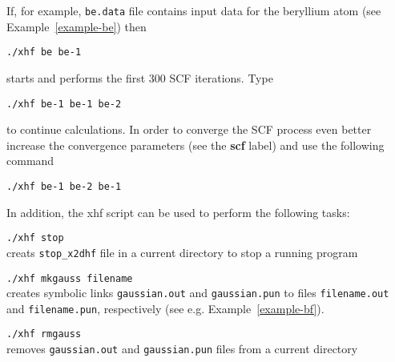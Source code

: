 \documentclass[12pt,a4paper]{article}
\begin{document}
If, for example, \texttt{be.data} file contains input data for
the beryllium atom (see Example~\ref{example-be}) then 
\begin{description} 
\item \hspace*{0.5cm} \texttt{./xhf be be-1}
\end{description} 
starts and performs the first 300 SCF iterations. Type
\begin{description} 
\item \hspace*{0.5cm} \texttt{./xhf be-1 be-1 be-2}
\end{description}  
to continue calculations. In order to converge the SCF process
even better increase the convergence parameters (see the \textbf{scf}
label) and use the following
command
\begin{description} 
\item \hspace*{0.5cm} \texttt{./xhf be-1 be-2 be-1}
\end{description}  



In addition, the xhf script can be used to perform the following
tasks:

\begin{description} 
\item \hspace*{0.5cm} \texttt{./xhf stop}\\ creats
  \texttt{stop\_x2dhf} file in a current directory to stop a running
  program%
\end{description} 

\begin{description} 
\item \hspace*{0.5cm} \texttt{./xhf mkgauss filename}\\ creates
  symbolic links \texttt{gaussian.out} and \texttt{gaussian.pun} to
  files \texttt{filename.\-out} and \texttt{filename.pun},
  respectively (see e.g. Example~\ref{example-bf}).
\end{description} 

\begin{description} 
\item \hspace*{0.5cm} \texttt{./xhf rmgauss}\\ removes
  \texttt{gaussian.out} and \texttt{gaussian.pun} files from a current
  directory
\end{description} 
\end{document}
